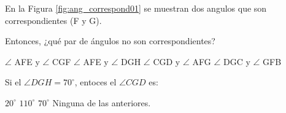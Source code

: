 En la Figura \ref{fig:ang_correspond01} se muestran dos angulos que son correspondientes (F y G).

\begin{minipage}{0.55\textwidth}
    \begin{parts}
        Entonces, ¿qué par de ángulos no son correspondientes?

        \begin{checkboxes}
            \choice $\angle$ AFE y $\angle$ CGF
            \choice $\angle$ AFE y $\angle$ DGH
            \choice $\angle$ CGD y $\angle$ AFG
            \CorrectChoice $\angle$ DGC y $\angle$ GFB
        \end{checkboxes}

        Si el $\angle DGH=70^\circ$, entoces el $\angle CGD$ es:

        \begin{checkboxes}
            \choice $20^\circ$
            \CorrectChoice $110^\circ$
            \choice $70^\circ$
            \choice Ninguna de las anteriores.
        \end{checkboxes}

    \end{parts}
\end{minipage}%
